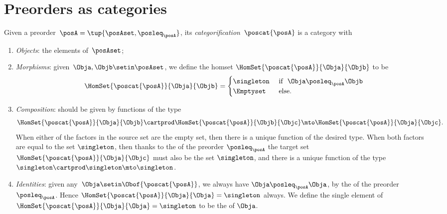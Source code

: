 
\section[Preorders as categories]{Preorders as categories}
\label{sec:posets-as-cats}

\begin{ctdefinition}\label{def:poscat}
    Given a preorder~$\posA = \tup{\posAset, \posleq_\posA}$, its \emph{categorification}~$\poscat{\posA}$ is a category with
    \begin{enumerate}
        \item \emph{Objects}: the elements of~$\posAset$;
        \item \emph{Morphisms}: given~$\Obja,\Objb\setin \posAset$, we define the homset $\HomSet{\poscat{\posA}}{\Obja}{\Objb}$ to be
        \begin{equation}
\HomSet{\poscat{\posA}}{\Obja}{\Objb} = 
\begin{cases}
\singleton & \text{ if }  \ \Obja \posleq_\posA \Objb \\
\Emptyset & \text{ else. }
\end{cases}
\end{equation}
        \item \emph{Composition}: should be given by functions of the type
        \begin{equation}
\HomSet{\poscat{\posA}}{\Obja}{\Objb} \cartprod \HomSet{\poscat{\posA}}{\Objb}{\Objc} \mto \HomSet{\poscat{\posA}}{\Obja}{\Objc}.
\end{equation}
When either of the factors in the source set are the empty set, then there is a unique function of the desired type. When both factors are equal to the set $\singleton$, then thanks to the \emph{} of the preorder $\posleq_\posA$ the target set $\HomSet{\poscat{\posA}}{\Obja}{\Objc}$ must also be the set $\singleton$, and there is a unique function of the type $\singleton \cartprod \singleton \mto \singleton$.
        \item \emph{Identities}: given any~$\Obja \setin \Obof{\poscat{\posA}}$, we always have $\Obja \posleq_\posA \Obja$, by the \emph{} of the preorder $\posleq_\posA$. Hence $\HomSet{\poscat{\posA}}{\Obja}{\Obja} = \singleton$ always. We define the single element of $\HomSet{\poscat{\posA}}{\Obja}{\Obja} = \singleton$ to be the  of $\Obja$. 
    \end{enumerate}
\end{ctdefinition}


